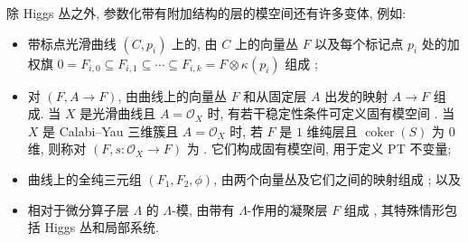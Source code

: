 除 Higgs 丛之外, 参数化带有附加结构的层的模空间还有许多变体, 例如:
\begin{itemize}
\item 带标点光滑曲线 $(C,p_i)$ 上的, 由 $C$ 上的向量丛 $F$ 以及每个标记点 $p_i$ 处的加权旗 $0=F_{i,0}\subseteq F_{i,1}\subseteq\cdots\subseteq F_{i,k}=F\otimes\kappa(p_i)$ 组成 \cite{MS80};
\item 对 $(F,A\to F)$, 由曲线上的向量丛 $F$ 和从固定层 $A$ 出发的映射 $A\to F$ 组成. 当 $X$ 是光滑曲线且 $A=\mathcal O_X$ 时, 有若干稳定性条件可定义固有模空间 \cite{BD91,Tha94}. 当 $X$ 是 Calabi--Yau 三维簇且 $A=\mathcal O_X$ 时, 若 $F$ 是 $1$ 维纯层且 $\operatorname{coker}(S)$ 为 $0$ 维, 则称对 $(F,s:\mathcal O_X\to F)$ 为 . 它们构成固有模空间, 用于定义 PT 不变量;
\item 曲线上的全纯三元组 $(F_1,F_2,\phi)$, 由两个向量丛及它们之间的映射组成 \cite{BGPG04}; 以及
\item 相对于微分算子层 $\Lambda$ 的 $\Lambda$-模, 由带有 $\Lambda$-作用的凝聚层 $F$ 组成 \cite{Sim94a}, 其特殊情形包括 Higgs 丛和局部系统.
\end{itemize}
